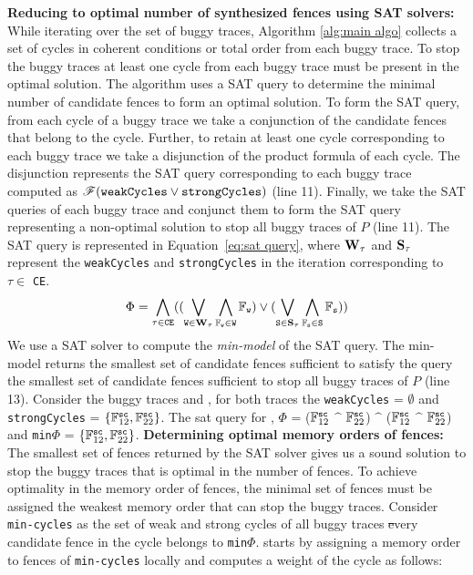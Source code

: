 \noindent
{\bf Reducing to optimal number of synthesized fences 
	using SAT solvers:}
While iterating over the set of buggy traces, Algorithm
\ref{alg:main algo} collects a set of cycles in coherent 
conditions or \sc total order from each buggy trace. 
To stop the buggy traces at least one cycle from each 
buggy trace must be present in the optimal solution.
%
The algorithm uses a SAT query to determine the minimal
number of candidate fences to form an optimal
solution. 
%
To form the SAT query, from each cycle of a buggy trace 
we take a conjunction of the candidate fences that belong 
to the cycle. Further, to retain at least one cycle 
corresponding to each buggy trace we take a disjunction
of the product formula of each cycle.
The disjunction represents the SAT query corresponding to 
each buggy trace computed as $\formula{{\tt weakCycles} \v 
{\tt strongCycles}}$ (line 11).
%
Finally, we take the SAT queries of each buggy trace and 
conjunct them to form the SAT query representing a 
non-optimal solution to stop all buggy traces of $P$ 
(line 11).
The SAT query is represented in Equation~\ref{eq:sat query},
where ${\tt \bf W_\tau}$ and ${\tt \bf S_\tau}$ represent
the {\tt weakCycles} and {\tt strongCycles} in the iteration
corresponding to $\tau \in$ {\tt CE}.
\begin{equation}\label{eq:sat query}
	\Phi = \bigwedge\limits_{\tau \in {\tt CE}}
		(
		(\bigvee\limits_{{\tt W} \in {\tt \bf W_\tau}}
			\bigwedge\limits_{\mathbb{F}_{\tt w} \in {\tt W}} 
			\mathbb{F}_{\tt w})
		\v
		(\bigvee\limits_{{\tt S} \in {\tt \bf S_\tau}}
			\bigwedge\limits_{\mathbb{F}_{\tt s} \in {\tt S}} 
			\mathbb{F}_{\tt s})
		)
\end{equation}
We use a SAT solver to compute the {\em min-model} of the 
SAT query. The min-model returns the smallest set of candidate 
fences sufficient to satisfy the query \ie the smallest set
of candidate fences sufficient to stop all buggy traces of 
$P$ (line 13).
%
Consider the buggy traces  and ,
for both traces the {\tt weakCycles} = $\emptyset$ and
{\tt strongCycles} = $\{\mathbb{F}^\sc_{12}, \mathbb{F}^\sc_{22}\}$.
The sat query for , $\Phi$ = 
($\mathbb{F}^\sc_{12}$ $\^$ $\mathbb{F}^\sc_{22}$) $\^$ 
($\mathbb{F}^\sc_{12}$ $\^$ $\mathbb{F}^\sc_{22}$) and 
{\tt min}$\Phi$ = $\{\mathbb{F}^\sc_{12}, \mathbb{F}^\sc_{22}\}$.
\noindent
{\bf Determining optimal memory orders of fences:}
The smallest set of fences returned by the SAT solver gives us 
a sound solution to stop the buggy traces that is optimal in the
number of fences.
To achieve optimality in the memory order of fences, the 
minimal set of fences must be assigned the weakest memory
order that can stop the buggy traces.
Consider {\tt min-cycles} as the set of weak and strong cycles 
of all buggy traces \st every candidate fence in the cycle belongs 
to {\tt min$\Phi$}. 
%
\ourtechnique starts by assigning a memory order to fences of 
{\tt min-cycles} locally and computes a weight of the cycle as 
follows: 

